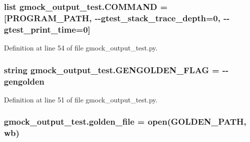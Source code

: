 \subsubsection[{\texorpdfstring{C\+O\+M\+M\+A\+ND}{COMMAND}}]{\setlength{\rightskip}{0pt plus 5cm}list gmock\+\_\+output\+\_\+test.\+C\+O\+M\+M\+A\+ND = \mbox{[}{\bf P\+R\+O\+G\+R\+A\+M\+\_\+\+P\+A\+TH}, \textquotesingle{}-\/-\/gtest\+\_\+stack\+\_\+trace\+\_\+depth=0\textquotesingle{}, \textquotesingle{}-\/-\/gtest\+\_\+print\+\_\+time=0\textquotesingle{}\mbox{]}}\hypertarget{namespacegmock__output__test_a33f8ca97d99711e23517962ca4c729af}{}\label{namespacegmock__output__test_a33f8ca97d99711e23517962ca4c729af}


Definition at line 54 of file gmock\+\_\+output\+\_\+test.\+py.

\subsubsection[{\texorpdfstring{G\+E\+N\+G\+O\+L\+D\+E\+N\+\_\+\+F\+L\+AG}{GENGOLDEN_FLAG}}]{\setlength{\rightskip}{0pt plus 5cm}string gmock\+\_\+output\+\_\+test.\+G\+E\+N\+G\+O\+L\+D\+E\+N\+\_\+\+F\+L\+AG = \textquotesingle{}-\/-\/gengolden\textquotesingle{}}\hypertarget{namespacegmock__output__test_a0bd3131fe8262154217588fed6b28d45}{}\label{namespacegmock__output__test_a0bd3131fe8262154217588fed6b28d45}


Definition at line 51 of file gmock\+\_\+output\+\_\+test.\+py.

\subsubsection[{\texorpdfstring{golden\+\_\+file}{golden_file}}]{\setlength{\rightskip}{0pt plus 5cm}gmock\+\_\+output\+\_\+test.\+golden\+\_\+file = open({\bf G\+O\+L\+D\+E\+N\+\_\+\+P\+A\+TH}, \textquotesingle{}wb\textquotesingle{})}\hypertarget{namespacegmock__output__test_aa592d26826a4dabf494fc2dd3c5c8b1e}{}\label{namespacegmock__output__test_aa592d26826a4dabf494fc2dd3c5c8b1e}


